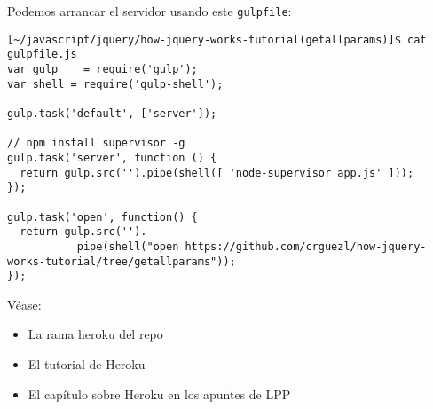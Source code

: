 Podemos arrancar el servidor usando este \verb|gulpfile|:

\begin{verbatim}
[~/javascript/jquery/how-jquery-works-tutorial(getallparams)]$ cat gulpfile.js 
var gulp    = require('gulp');
var shell = require('gulp-shell');

gulp.task('default', ['server']);

// npm install supervisor -g
gulp.task('server', function () {
  return gulp.src('').pipe(shell([ 'node-supervisor app.js' ]));
});

gulp.task('open', function() {
  return gulp.src('').
           pipe(shell("open https://github.com/crguezl/how-jquery-works-tutorial/tree/getallparams"));
});
\end{verbatim}


Véase:
\begin{itemize}
\item
La rama heroku del repo 
\item
El tutorial de Heroku 
\item
El capítulo sobre Heroku en los apuntes de LPP
\end{itemize}

